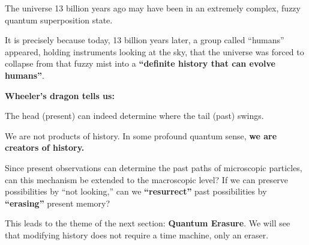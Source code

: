 The universe 13 billion years ago may have been in an extremely complex, fuzzy quantum superposition state.

It is precisely because today, 13 billion years later, a group called ``humans'' appeared, holding instruments looking at the sky, that the universe was forced to collapse from that fuzzy mist into a \textbf{``definite history that can evolve humans''}.

\textbf{Wheeler's dragon tells us:}

The head (present) can indeed determine where the tail (past) swings.

We are not products of history. In some profound quantum sense, \textbf{we are creators of history.}

Since present observations can determine the past paths of microscopic particles, can this mechanism be extended to the macroscopic level? If we can preserve possibilities by ``not looking,'' can we \textbf{``resurrect''} past possibilities by \textbf{``erasing''} present memory?

This leads to the theme of the next section: \textbf{Quantum Erasure}. We will see that modifying history does not require a time machine, only an eraser.

